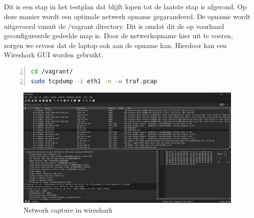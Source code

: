 \subsection{}%
\label{sec:Test-NIC}%

\subsection{}%
\label{sec:Test-capture}%

Dit is een stap in het testplan dat blijft lopen tot de laatste stap is afgerond. Op deze manier wordt een optimale netwerk opname gegarandeerd. De opname wordt uitgevoerd vanuit de /vagrant directory. Dit is omdat dit de op voorhand geconfigureerde gedeelde map is. Door de netwerkopname hier uit te voeren, zorgen we ervoor dat de laptop ook aan de opname kan. Hierdoor kan een Wireshark GUI worden gebruikt.

\begin{lstlisting}[basicstyle=\small, frame=single, breaklines=true, postbreak=\mbox{\textcolor{red}{$\hookrightarrow$}\space}, escapeinside ={\%,}, escapechar={!}, numbers=left, language=sh, caption=Test - Tcpdump]
cd /vagrant/
sudo tcpdump -i eth1 -n -w traf.pcap
\end{lstlisting}

\begin{figure}[H]
    \includegraphics[width=\linewidth]{../graphics/POC-wireshark.png}
    \caption{Network capture in wireshark}
    \label{fig:wireshark}
\end{figure}

\subsection{}%
\label{sec:Test-ping}%

